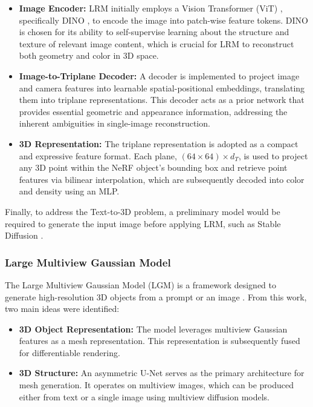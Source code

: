 \documentclass[journal]{IEEEtran}
\begin{document}
\begin{itemize}  
\item \textbf{Image Encoder:} LRM initially employs a Vision Transformer (ViT) \cite{dosovitskiy_image_2021}, specifically DINO \cite{caron_emerging_2021}, to encode the image into patch-wise feature tokens. DINO is chosen for its ability to self-supervise learning about the structure and texture of relevant image content, which is crucial for LRM to reconstruct both geometry and color in 3D space.  

\item \textbf{Image-to-Triplane Decoder:} A decoder is implemented to project image and camera features into learnable spatial-positional embeddings, translating them into triplane representations. This decoder acts as a prior network that provides essential geometric and appearance information, addressing the inherent ambiguities in single-image reconstruction.  

\item \textbf{3D Representation:} The triplane representation is adopted as a compact and expressive feature format. Each plane, $(64 \times 64) \times d_T$, is used to project any 3D point within the NeRF object's bounding box and retrieve point features via bilinear interpolation, which are subsequently decoded into color and density using an MLP. \\ 
\end{itemize}  

Finally, to address the Text-to-3D problem, a preliminary model would be required to generate the input image before applying LRM, such as Stable Diffusion \cite{rombach_high-resolution_2022}.\\

\subsubsection{Large Multiview Gaussian Model}

The Large Multiview Gaussian Model (LGM) is a framework designed to generate high-resolution 3D objects from a prompt or an image \cite{tang2024lgm}. From this work, two main ideas were identified: \\ 

\begin{itemize}  
\item \textbf{3D Object Representation:} The model leverages multiview Gaussian features as a mesh representation. This representation is subsequently fused for differentiable rendering.  
\item \textbf{3D Structure:} An asymmetric U-Net serves as the primary architecture for mesh generation. It operates on multiview images, which can be produced either from text or a single image using multiview diffusion models.  \\
\end{itemize}  
\end{document}
